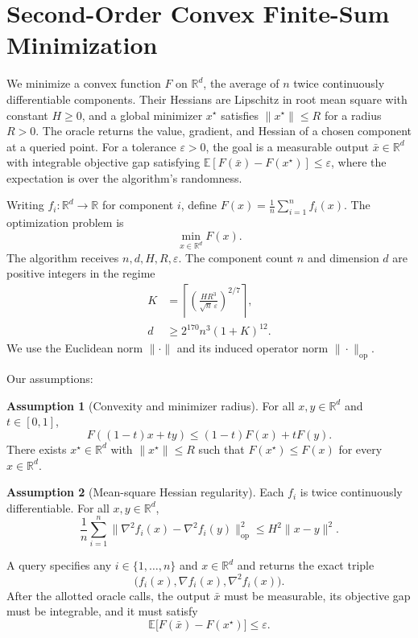 \documentclass[10pt]{article}
\theoremstyle{definition}
\newtheorem{assumption}{Assumption}
\begin{document}
\section*{Second-Order Convex Finite-Sum Minimization}
We minimize a convex function $F$ on $\mathbb{R}^d$, the average of $n$ twice continuously differentiable components. Their Hessians are Lipschitz in root mean square with constant $H\geq 0$, and a global minimizer $x^\star$ satisfies $\|x^\star\|\leq R$ for a radius $R>0$. The oracle returns the value, gradient, and Hessian of a chosen component at a queried point. For a tolerance $\varepsilon>0$, the goal is a measurable output $\bar{x}\in\mathbb{R}^d$ with integrable objective gap satisfying $\mathbb{E}[F(\bar{x})-F(x^\star)]\leq\varepsilon$, where the expectation is over the algorithm's randomness.

Writing $f_i:\mathbb{R}^d\to\mathbb{R}$ for component $i$, define $F(x)=\frac{1}{n}\sum_{i=1}^n f_i(x)$. The optimization problem is
\[
\min_{x\in\mathbb{R}^d} F(x).
\]
The algorithm receives $n,d,H,R,\varepsilon$. The component count $n$ and dimension $d$ are positive integers in the regime
\[
\begin{aligned}
K &= \left\lceil\left(\frac{H R^3}{\sqrt{n}\,\varepsilon}\right)^{2/7}\right\rceil,\\
d &\geq 2^{170} n^3 (1+K)^{12}.
\end{aligned}
\]
We use the Euclidean norm $\|\cdot\|$ and its induced operator norm $\|\cdot\|_{\mathrm{op}}$.

Our assumptions:
\begin{assumption}[Convexity and minimizer radius]
For all $x,y\in\mathbb{R}^d$ and $t\in[0,1]$,
\[
F((1-t)x+ty)\leq (1-t)F(x)+tF(y).
\]
There exists $x^\star\in\mathbb{R}^d$ with $\|x^\star\|\leq R$ such that $F(x^\star)\leq F(x)$ for every $x\in\mathbb{R}^d$.
\end{assumption}

\begin{assumption}[Mean-square Hessian regularity]
Each $f_i$ is twice continuously differentiable. For all $x,y\in\mathbb{R}^d$,
\[
\frac{1}{n}\sum_{i=1}^n
\bigl\|\nabla^2 f_i(x)-\nabla^2 f_i(y)\bigr\|_{\mathrm{op}}^2
\leq H^2\|x-y\|^2.
\]
\end{assumption}

A query specifies any $i\in\{1,\ldots,n\}$ and $x\in\mathbb{R}^d$ and returns the exact triple
\[
\bigl(f_i(x),\nabla f_i(x),\nabla^2 f_i(x)\bigr).
\]
After the allotted oracle calls, the output $\bar{x}$ must be measurable, its objective gap must be integrable, and it must satisfy
\[
\mathbb{E}\bigl[F(\bar{x})-F(x^\star)\bigr]\leq\varepsilon.
\]
\end{document}
